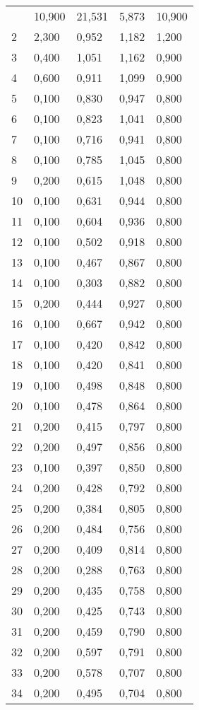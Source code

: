 \begin{longtable}{|l|l|l|l|l|}
        \hline \hline
        \endlastfoot
        1&10,900&21,531&5,873&10,900\\
        2&2,300&0,952&1,182&1,200\\
        3&0,400&1,051&1,162&0,900\\
        4&0,600&0,911&1,099&0,900\\
        5&0,100&0,830&0,947&0,800\\
        6&0,100&0,823&1,041&0,800\\
        7&0,100&0,716&0,941&0,800\\
        8&0,100&0,785&1,045&0,800\\
        9&0,200&0,615&1,048&0,800\\
        10&0,100&0,631&0,944&0,800\\
        11&0,100&0,604&0,936&0,800\\
        12&0,100&0,502&0,918&0,800\\
        13&0,100&0,467&0,867&0,800\\
        14&0,100&0,303&0,882&0,800\\
        15&0,200&0,444&0,927&0,800\\
        16&0,100&0,667&0,942&0,800\\
        17&0,100&0,420&0,842&0,800\\
        18&0,100&0,420&0,841&0,800\\
        19&0,100&0,498&0,848&0,800\\
        20&0,100&0,478&0,864&0,800\\
        21&0,200&0,415&0,797&0,800\\
        22&0,200&0,497&0,856&0,800\\
        23&0,100&0,397&0,850&0,800\\
        24&0,200&0,428&0,792&0,800\\
        25&0,200&0,384&0,805&0,800\\
        26&0,200&0,484&0,756&0,800\\
        27&0,200&0,409&0,814&0,800\\
        28&0,200&0,288&0,763&0,800\\
        29&0,200&0,435&0,758&0,800\\
        30&0,200&0,425&0,743&0,800\\
        31&0,200&0,459&0,790&0,800\\
        32&0,200&0,597&0,791&0,800\\
        33&0,200&0,578&0,707&0,800\\
        34&0,200&0,495&0,704&0,800\\

\end{longtable}
